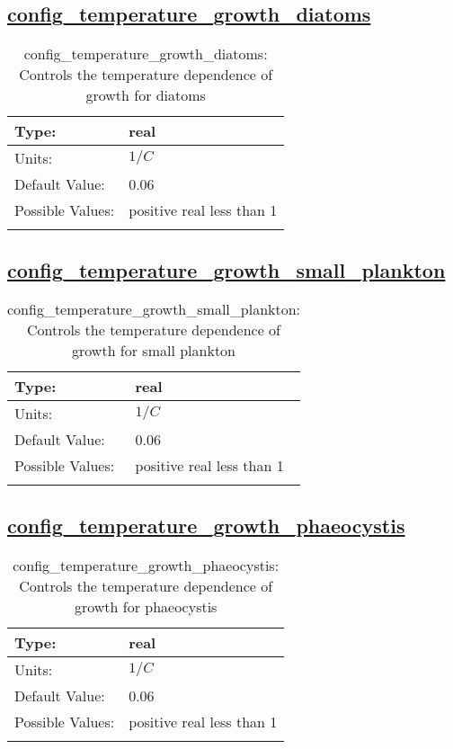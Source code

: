 \subsection[config\_temperature\_growth\_diatoms]{\hyperref[sec:nm_tab_biogeochemistry]{config\_temperature\_growth\_diatoms}}
\label{subsec:nm_sec_config_temperature_growth_diatoms}
\begin{center}
\begin{longtable}{| p{2.0in} || p{4.0in} |}
    \hline
    Type: & real \\
    \hline
    Units: & $1/C$ \\
    \hline
    Default Value: & 0.06 \\
    \hline
    Possible Values: & positive real less than 1 \\
    \hline
    \caption{config\_temperature\_growth\_diatoms: Controls the temperature dependence of growth for diatoms}
\end{longtable}
\end{center}
\subsection[config\_temperature\_growth\_small\_plankton]{\hyperref[sec:nm_tab_biogeochemistry]{config\_temperature\_growth\_small\_plankton}}
\label{subsec:nm_sec_config_temperature_growth_small_plankton}
\begin{center}
\begin{longtable}{| p{2.0in} || p{4.0in} |}
    \hline
    Type: & real \\
    \hline
    Units: & $1/C$ \\
    \hline
    Default Value: & 0.06 \\
    \hline
    Possible Values: & positive real less than 1 \\
    \hline
    \caption{config\_temperature\_growth\_small\_plankton: Controls the temperature dependence of growth for small plankton}
\end{longtable}
\end{center}
\subsection[config\_temperature\_growth\_phaeocystis]{\hyperref[sec:nm_tab_biogeochemistry]{config\_temperature\_growth\_phaeocystis}}
\label{subsec:nm_sec_config_temperature_growth_phaeocystis}
\begin{center}
\begin{longtable}{| p{2.0in} || p{4.0in} |}
    \hline
    Type: & real \\
    \hline
    Units: & $1/C$ \\
    \hline
    Default Value: & 0.06 \\
    \hline
    Possible Values: & positive real less than 1 \\
    \hline
    \caption{config\_temperature\_growth\_phaeocystis: Controls the temperature dependence of growth for phaeocystis}
\end{longtable}
\end{center}
